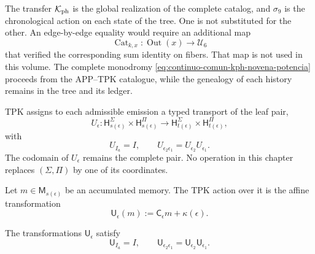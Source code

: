 \begin{remark}
\label{rem:continuo-comun-kph-no-identificacion-aristas}
The transfer \(\mathcal K_{\rm ph}\) is the global realization of the
complete catalog, and \(\sigma_9\) is the chronological action on each state
of the tree. One is not substituted for the other. An edge-by-edge equality
would require an additional map
\[
 \operatorname{Cat}_{k,x}:\operatorname{Out}(x)\longrightarrow\mathcal U_6
\]
that verified the corresponding sum identity on fibers. That map
is not used in this volume. The complete monodromy
\eqref{eq:continuo-comun-kph-novena-potencia} proceeds from the
APP--TPK catalogue, while the genealogy of each history remains in the tree and
its ledger.
\end{remark}

TPK assigns to each admissible emission a typed transport of the leaf pair,
\begin{equation}
\label{eq:continuo-comun-transporte-hojas}
 U_\epsilon:
 \mathsf H_{s(\epsilon)}^{\Sigma}\times
 \mathsf H_{s(\epsilon)}^{\Pi}
 \longrightarrow
 \mathsf H_{t(\epsilon)}^{\Sigma}\times
 \mathsf H_{t(\epsilon)}^{\Pi},
\end{equation}
with
\begin{equation}
\label{eq:continuo-comun-transporte-hojas-funtorial}
 U_{I_a}=I,
 \qquad
 U_{\epsilon_2\epsilon_1}=U_{\epsilon_2}U_{\epsilon_1}.
\end{equation}
The codomain of \(U_\epsilon\) remains the complete pair. No
operation in this chapter replaces
\((\Sigma,\Pi)\) by one of its coordinates.

Let \(m\in\mathsf M_{s(\epsilon)}\) be an accumulated memory.  The TPK action
over it is the affine transformation
\begin{equation}
\label{eq:continuo-comun-accion-memoria}
 \mathsf U_\epsilon(m)
 :=\mathsf C_\epsilon m+\kappa(\epsilon).
\end{equation}

\begin{lemma}
\label{lem:continuo-comun-accion-memoria}
The transformations \(\mathsf U_\epsilon\) satisfy
\begin{equation}
\label{eq:continuo-comun-accion-memoria-composicion}
 \mathsf U_{I_a}=I,
 \qquad
 \mathsf U_{\epsilon_2\epsilon_1}
 =\mathsf U_{\epsilon_2}\mathsf U_{\epsilon_1}.
\end{equation}
\end{lemma}

